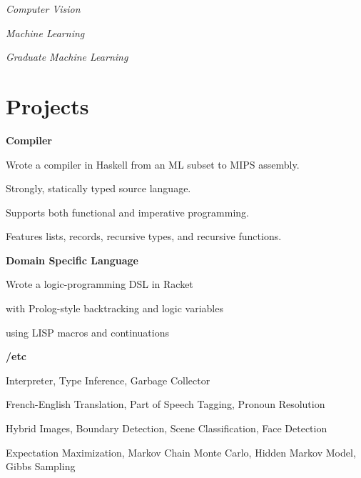 \documentclass[margin,line]{resume}
\begin{document}
\begin{resume}
        \textsl{Computer Vision} \par\vspace{-4mm}%
    {\addtolength{\leftskip}{2 mm}  
    \par}
    
        \textsl{Machine Learning} \par\vspace{-4mm}%
    {\addtolength{\leftskip}{2 mm}       
    \par}
   
       \textsl{Graduate Machine Learning} \par\vspace{-1mm}%
    {\addtolength{\leftskip}{2 mm}       
    \par}
    \section{\mysidestyle{} Projects}

    \textbf{Compiler}    \par\vspace{-4.0mm}%
      {\addtolength{\leftskip}{2 mm}
 Wrote a compiler in Haskell from an ML subset to MIPS assembly. 
 \begin{list2}
  \item Strongly, statically typed source language.
  \item Supports both functional and imperative programming.
  \item Features lists, records, recursive types, and recursive functions. 
 \end{list2}
      \par}

    \textbf{Domain Specific Language}  \par\vspace{-4.0mm}%
      {\addtolength{\leftskip}{2 mm}
      Wrote a logic-programming DSL in Racket
       \begin{list2}
  \item with Prolog-style backtracking and logic variables
  \item using LISP macros and continuations
 \end{list2}
      \par}      

      \textbf{/etc}  \par 
      {\addtolength{\leftskip}{2 mm}
   \begin{list2}
   \item Interpreter, Type Inference, Garbage Collector
   \item French-English Translation, Part of Speech Tagging, Pronoun Resolution
   \item Hybrid Images, Boundary Detection, Scene Classification, Face Detection
     \item Expectation Maximization, Markov Chain Monte Carlo, Hidden Markov Model, Gibbs Sampling
       \end{list2}
      \par}      


\end{resume}
\end{document}
